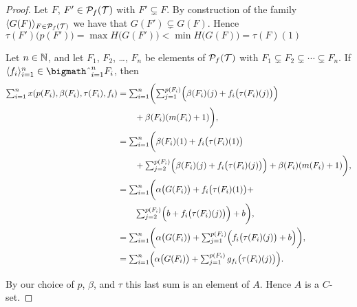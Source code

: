 \begin{proof}
  Let $F$, $F' \in \mathcal{P}_f(\mathcal{T})$ with $F' \subsetneq F$. 
  By construction of the family $\langle G(F) \rangle_{F \in \mathcal{P}_f(\mathcal{T})}$ we have that $G(F') \subsetneq G(F)$.
  Hence $\tau(F')\bigl( p(F') \bigr) = \max H \bigl( G(F') \bigr) < \min H \bigl( G(F) \bigr) = \tau(F)(1)$

  Let $n \in \mathbb{N}$, and let $F_1$, $F_2$, \ldots, $F_n$ be elements of $\mathcal{P}_f(\mathcal{T})$ with $F_1 \subsetneq F_2 \subsetneq \cdots \subsetneq F_n$. 
  If $\la f_i \ra_{i=1}^n \in \bigtimes_{i=1}^n F_i$, then 
  \begin{align*}
    \textstyle
    \sum_{i=1}^n x(p(F_i), \beta(F_i), \tau(F_i), f_i) 
    &= \textstyle \sum_{i=1}^n \biggl( \sum_{j=1}^{p(F_i)} \Bigl( \beta(F_i)(j) + f_i\bigl(\tau(F_i)(j)\bigr)\Bigr) \\
    &\hspace{2em} + \beta(F_i)(m(F_i)+1) \biggr),  \\
    &= \textstyle \sum_{i=1}^n \biggl( \beta(F_i)(1) + f_i\bigl( \tau(F_i)(1)\bigr) \\ 
    &\hspace{2em} \textstyle + \sum_{j=2}^{p(F_i)} \Bigl( \beta(F_i)(j) + f_i\bigl(\tau(F_i)(j)\bigr)\Bigr) + \beta(F_i)(m(F_i)+1) \biggr), \\
    &= \textstyle \sum_{i=1}^n \biggl( \alpha\bigl( G(F_i) \bigr) + f_i\bigl( \tau(F_i)(1)\bigr) + \\
    &\hspace{2em} \textstyle \sum_{j=2}^{p(F_i)} \Bigl( b + f_i\bigl(\tau(F_i)(j)\bigr)\Bigr) + b \biggr), \\
    &= \textstyle \sum_{i=1}^n \biggl( \alpha\bigl( G(F_i) \bigr) +
    \textstyle \sum_{j=1}^{p(F_i)} \Bigl( f_i\bigl(\tau(F_i)(j)\bigr) + b\Bigr) \biggr), \\
    &= \textstyle \sum_{i=1}^n \Bigl( \alpha\bigl( G(F_i) \bigr) +
    \textstyle \sum_{j=1}^{p(F_i)} g_{f_i}\bigl(\tau(F_i)(j)\bigr) \Bigr).
  \end{align*}

  By our choice of $p$, $\beta$, and $\tau$ this last sum is an element of  $A$. 
  Hence $A$ is a $C$-set.

\end{proof}

 \theendnotes
